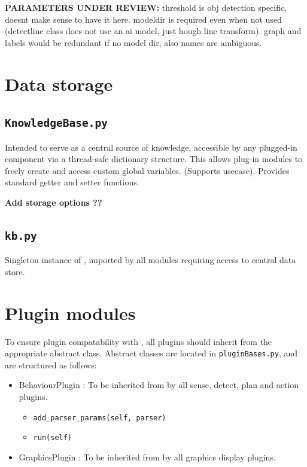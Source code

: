 \documentclass[10pt]{article}
\begin{document}
\textbf{PARAMETERS UNDER REVIEW:} threshold is obj detection specific, doesnt make sense to have it here. modeldir is required even when not used (detectline class does not use an ai model, just hough line transform). graph and labels would be redundant if no model dir, also names are ambiguous.

\section{Data storage}

\subsection{\texttt{KnowledgeBase.py}}
\label{sec:KnowledgeBase.py}

Intended to serve as a central source of knowledge, accessible by any plugged-in component via a thread-safe dictionary structure. This allows plug-in modules to freely create and access custom global variables. (Supports usecase).
Provides standard getter and setter functions. 

\textbf{Add storage options ??}

\subsection{\texttt{kb.py}}
\label{sec:kb.py}

Singleton instance of , imported by all modules requiring access to central data store.

\section{Plugin modules}

To ensure plugin compatability with , all plugins should inherit from the appropriate abstract class. Abstract classes are located in \texttt{pluginBases.py}, and are structured as follows:

\begin{itemize}
    \item BehaviourPlugin : To be inherited from by all sense, detect, plan and action plugins. 
    \begin{itemize}
    \item \texttt{add\_parser\_params(self, parser)}
    \item \texttt{run(self)}
    \end{itemize}
    \item GraphicsPlugin : To be inherited from by all graphics display plugins.
    
\end{itemize}
\end{document}
